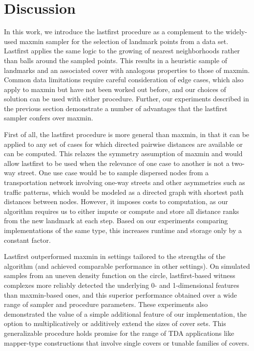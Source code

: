\documentclass{article}
\begin{document}
\hypertarget{discussion}{%
\section{Discussion}\label{discussion}}

\label{sec:discussion}

In this work, we introduce the lastfirst procedure as a complement to
the widely-used maxmin sampler for the selection of landmark points from
a data set. Lastfirst applies the same logic to the growing of nearest
neighborhoods rather than balls around the sampled points. This results
in a heuristic sample of landmarks and an associated cover with
analogous properties to those of maxmin. Common data limitations require
careful consideration of edge cases, which also apply to maxmin but have
not been worked out before, and our choices of solution can be used with
either procedure. Further, our experiments described in the previous
section demonstrate a number of advantages that the lastfirst sampler
confers over maxmin.

First of all, the lastfirst procedure is more general than maxmin, in
that it can be applied to any set of cases for which directed pairwise
distances are available or can be computed. This relaxes the symmetry
assumption of maxmin and would allow lastfirst to be used when the
relevance of one case to another is not a two-way street. One use case
would be to sample dispersed nodes from a transportation network
involving one-way streets and other asymmetries such as traffic
patterns, which would be modeled as a directed graph with shortest path
distances between nodes. However, it imposes costs to computation, as
our algorithm requires us to either impute or compute and store all
distance ranks from the new landmark at each step. Based on our
experiments comparing implementations of the same type, this increases
runtime and storage only by a constant factor.

Lastfirst outperformed maxmin in settings tailored to the strengths of
the algorithm (and achieved comparable performance in other settings).
On simulated samples from an uneven density function on the circle,
lastfirst-based witness complexes more reliably detected the underlying
0- and 1-dimensional features than maxmin-based ones, and this superior
performance obtained over a wide range of sampler and procedure
parameters. These experiments also demonstrated the value of a simple
additional feature of our implementation, the option to multiplicatively
or additively extend the sizes of cover sets. This generalizable
procedure holds promise for the range of TDA applications like
mapper-type constructions that involve single covers or tunable families
of covers.
\end{document}
